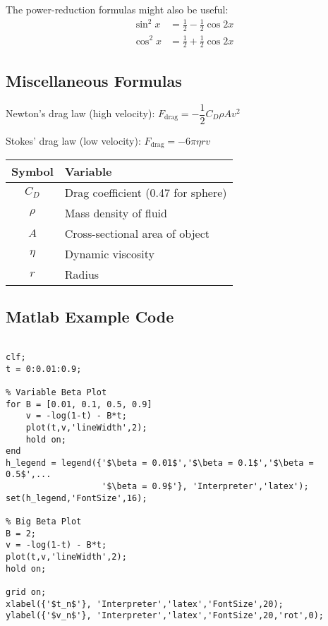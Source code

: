 \documentclass{article}
\begin{document}
The power-reduction formulas might also be useful:
\begin{equation*}
\begin{aligned}
\sin^2x &= \frac{1}{2} - \frac{1}{2}\cos 2x \\
\cos^2x &= \frac{1}{2} + \frac{1}{2}\cos 2x
\end{aligned}
\end{equation*}

\subsection*{Miscellaneous Formulas}
\begin{center}
Newton's drag law (high velocity): $F_{\text{drag}} = -\dfrac{1}{2}C_D\rho Av^2$

Stokes' drag law (low velocity): $F_{\text{drag}} = -6\pi \eta rv$

\begin{table}[H]
	\centering
	\begin{tabular}{cl}
		\textbf{Symbol} & \textbf{Variable} \\
		\midrule
		$C_D$ & Drag coefficient (0.47 for sphere) \\
		$\rho$ & Mass density of fluid \\
		$A$ & Cross-sectional area of object \\
		$\eta$ & Dynamic viscosity \\
		$r$ & Radius \\
	\end{tabular}
\end{table}
\end{center}
\subsection*{Matlab Example Code}
\begin{lstlisting}[style=Matlab-editor]
% Rocket Problem Plot Code

clf;
t = 0:0.01:0.9;

% Variable Beta Plot
for B = [0.01, 0.1, 0.5, 0.9]
    v = -log(1-t) - B*t;
    plot(t,v,'lineWidth',2);
    hold on;
end
h_legend = legend({'$\beta = 0.01$','$\beta = 0.1$','$\beta = 0.5$',...
                   '$\beta = 0.9$'}, 'Interpreter','latex');
set(h_legend,'FontSize',16);

% Big Beta Plot
B = 2;
v = -log(1-t) - B*t;
plot(t,v,'lineWidth',2);
hold on;

grid on;
xlabel({'$t_n$'}, 'Interpreter','latex','FontSize',20);
ylabel({'$v_n$'}, 'Interpreter','latex','FontSize',20,'rot',0);
\end{lstlisting}
\end{document}
